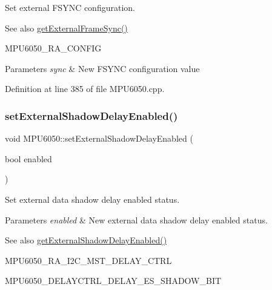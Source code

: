 Set external F\+S\+Y\+NC configuration. 

\begin{DoxySeeAlso}{See also}
\mbox{\hyperlink{classMPU6050_a902a7d486cd6ac21f8c378634dc6f59a}{get\+External\+Frame\+Sync()}} 

M\+P\+U6050\+\_\+\+R\+A\+\_\+\+C\+O\+N\+F\+IG 
\end{DoxySeeAlso}

\begin{DoxyParams}{Parameters}
{\em sync} & New F\+S\+Y\+NC configuration value \\
\hline
\end{DoxyParams}


Definition at line 385 of file M\+P\+U6050.\+cpp.

\mbox{\label{classMPU6050_a9160193d883871037c6535a9d3e02ee2}} 
\subsubsection{\texorpdfstring{setExternalShadowDelayEnabled()}{setExternalShadowDelayEnabled()}}
{\footnotesize\ttfamily void M\+P\+U6050\+::set\+External\+Shadow\+Delay\+Enabled (\begin{DoxyParamCaption}\item[{bool}]{enabled }\end{DoxyParamCaption})}



Set external data shadow delay enabled status. 


\begin{DoxyParams}{Parameters}
{\em enabled} & New external data shadow delay enabled status. \\
\hline
\end{DoxyParams}
\begin{DoxySeeAlso}{See also}
\mbox{\hyperlink{classMPU6050_a0e5cb13838298609b5260fd1558f8c92}{get\+External\+Shadow\+Delay\+Enabled()}} 

M\+P\+U6050\+\_\+\+R\+A\+\_\+\+I2\+C\+\_\+\+M\+S\+T\+\_\+\+D\+E\+L\+A\+Y\+\_\+\+C\+T\+RL 

M\+P\+U6050\+\_\+\+D\+E\+L\+A\+Y\+C\+T\+R\+L\+\_\+\+D\+E\+L\+A\+Y\+\_\+\+E\+S\+\_\+\+S\+H\+A\+D\+O\+W\+\_\+\+B\+IT 
\end{DoxySeeAlso}


